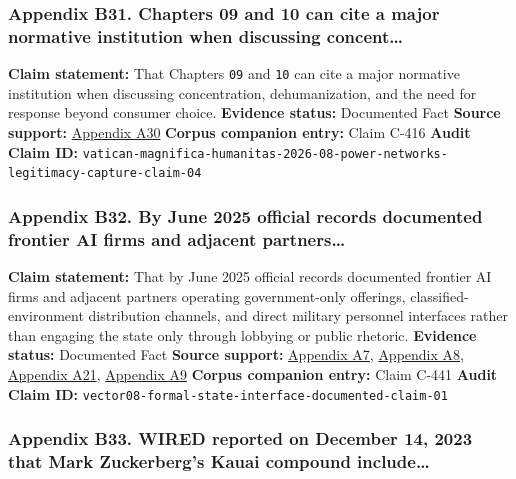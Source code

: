 \documentclass[
  american,
  11pt,
  letterpaper,
]{article}
\begin{document}
\subsubsection{Appendix B31. Chapters 09 and 10 can cite a major
normative institution when discussing
concent\ldots{}}\label{ch-10-appendix-b31-chapters-09-and-10-can-cite-a-major-normative-institution-when-discussing-concent}

\textbf{Claim statement:} That Chapters \texttt{09} and \texttt{10} can
cite a major normative institution when discussing concentration,
dehumanization, and the need for response beyond consumer choice.
\textbf{Evidence status:} Documented Fact \textbf{Source support:}
\hyperref[ch-10-appendix-a30-encyclical-letter-of-his-holiness-leo-xiv-magnifica-humanitas]{Appendix
A30} \textbf{Corpus companion entry:} Claim C-416 \textbf{Audit Claim
ID:}
\texttt{vatican-magnifica-humanitas-2026-08-power-networks-legitimacy-capture-claim-04}

\subsubsection{Appendix B32. By June 2025 official records documented
frontier AI firms and adjacent
partners\ldots{}}\label{ch-10-appendix-b32-by-june-2025-official-records-documented-frontier-ai-firms-and-adjacent-partners}

\textbf{Claim statement:} That by June 2025 official records documented
frontier AI firms and adjacent partners operating government-only
offerings, classified-environment distribution channels, and direct
military personnel interfaces rather than engaging the state only
through lobbying or public rhetoric. \textbf{Evidence status:}
Documented Fact \textbf{Source support:}
\hyperref[ch-10-appendix-a7-introducing-openai-for-government]{Appendix
A7},
\hyperref[ch-10-appendix-a8-claude-gov-models-for-u-s-national-security-customers]{Appendix
A8},
\hyperref[ch-10-appendix-a21-anthropic-and-palantir-partner-to-bring-claude-ai-models-to-aws-for-u-s-government-intelligence-and-defense-operations]{Appendix
A21},
\hyperref[ch-10-appendix-a9-army-launches-detachment-201-executive-innovation-corps-to-drive-tech-transformation]{Appendix
A9} \textbf{Corpus companion entry:} Claim C-441 \textbf{Audit Claim
ID:} \texttt{vector08-formal-state-interface-documented-claim-01}

\subsubsection{Appendix B33. WIRED reported on December 14, 2023 that
Mark Zuckerberg's Kauai compound
include\ldots{}}\label{ch-10-appendix-b33-wired-reported-on-december-14-2023-that-mark-zuckerberg-s-kauai-compound-include}
\end{document}
